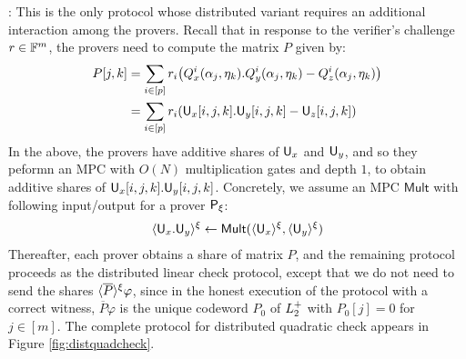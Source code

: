: This is the only protocol
whose    distributed variant requires an additional interaction among the
provers. Recall    that in response to the verifier’s challenge $r\in \mathbb{F}^m$,
the provers need to    compute the matrix $P$ given by:
\begin{align*}
P[j,k] & =\sum_{i\in
[p]}r_i\big(Q_x^i(\alpha_j,\eta_k).Q_y^i(\alpha_j,\eta_k)-Q_z^i(\alpha_j,\eta_k)\big)\\    
& = \sum_{i\in [p]}r_i(\mathsf{U}_x[i,j,k].\mathsf{U}_y[i,j,k] - \mathsf{U}_z[i,j,k])
\end{align*}    
In the above, the provers have additive shares of $\mathsf{U}_x$ and
$\mathsf{U}_y$, and so they peformn an MPC with $O(N)$ multiplication gates and
depth $1$, to obtain additive shares of $\mathsf{U}_x[i,j,k].\mathsf{U}_y[i,j,k]$.
Concretely, we assume an MPC $\mathsf{Mult}$    with following input/output for
a prover $\mathsf{P}_\xi$:     
\begin{align*}    
\langle{\mathsf{U}_x.\mathsf{U}_y}\rangle^\xi\leftarrow \mathsf{Mult}(\langle{\mathsf{U}_x}\rangle^\xi,\langle{\mathsf{U}_y}\rangle^\xi)    
\end{align*}    
Thereafter, each
prover obtains a share of matrix $P$, and the remaining protocol proceeds as
the distributed linear check protocol, except that we do not need to send the
shares $\langle{\overline{P}}\rangle^\xi\varphi$, since in the honest execution of the
protocol with a correct witness, $\overline{P}\varphi$ is the unique codeword
$P_0$ of $L^{+}_2$ with $P_0[j]=0$ for $j\in [m]$. The complete protocol for
distributed quadratic check appears in Figure \ref{fig:distquadcheck}.


